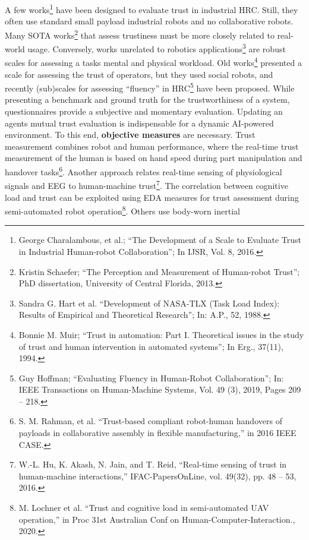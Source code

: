 A few works\footnote{George Charalambous, et al.; ``The Development of a
  Scale to Evaluate Trust in Industrial Human-robot Collaboration''; In
  IJSR, Vol. 8, 2016.} have been designed to evaluate trust in
industrial HRC. Still, they often use standard small payload industrial
robots and no collaborative robots. Many SOTA works\footnote{Kristin
  Schaefer; ``The Perception and Measurement of Human-robot Trust''; PhD
  dissertation, University of Central Florida, 2013.} that assess
trustiness must be more closely related to real-world usage. Conversely,
works unrelated to robotics applications\footnote{Sandra G. Hart et al.
  ``Development of NASA-TLX (Task Load Index): Results of Empirical and
  Theoretical Research''; In: A.P., 52, 1988.} are robust scales for
assessing a task\textquotesingle s mental and physical workload. Old
works\footnote{Bonnie M. Muir; ``Trust in automation: Part I.
  Theoretical issues in the study of trust and human intervention in
  automated systems''; In Erg., 37(11), 1994.} presented a scale for
assessing the trust of operators, but they used social robots, and
recently (sub)scales for assessing ``fluency'' in HRC\footnote{Guy
  Hoffman; ``Evaluating Fluency in Human-Robot Collaboration''; In: IEEE
  Transactions on Human-Machine Systems, Vol. 49 (3), 2019, Pages 209 --
  218.} have been proposed. While presenting a benchmark and ground
truth for the trustworthiness of a system, questionnaires provide a
subjective and momentary evaluation. Updating an agent\textquotesingle s
mutual trust evaluation is indispensable for a dynamic AI-powered
environment. To this end, \textbf{objective measures} are necessary.
Trust measurement combines robot and human performance, where the
real-time trust measurement of the human is based on hand speed during
part manipulation and handover tasks\footnote{S. M. Rahman, et al.
  ``Trust-based compliant robot-human handovers of payloads in
  collaborative assembly in flexible manufacturing,'' in 2016 IEEE CASE.}.
Another approach relates real-time sensing of physiological signals and
EEG to human-machine trust\footnote{W.-L. Hu, K. Akash, N. Jain, and T.
  Reid, ``Real-time sensing of trust in human-machine interactions,''
  IFAC-PapersOnLine, vol. 49(32), pp. 48 -- 53, 2016.}. The correlation
between cognitive load and trust can be exploited using EDA measures for
trust assessment during semi-automated robot operation\footnote{M.
  Lochner et al. ``Trust and cognitive load in semi-automated UAV
  operation,'' in Proc 31st Australian Conf on
  Human-Computer-Interaction., 2020.}. Others use body-worn inertial

